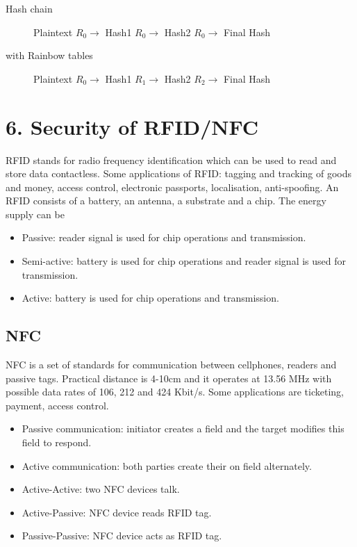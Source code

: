 \documentclass{article}
\begin{document}
\begin{description}
\item[Hash chain] Plaintext $R_0 \rightarrow$ Hash1 $R_0 \rightarrow$ Hash2 $R_0 \rightarrow$ Final Hash
\item[with Rainbow tables] Plaintext $R_0 \rightarrow$ Hash1 $R_1 \rightarrow$ Hash2 $R_2 \rightarrow$ Final Hash
\end{description}

\section*{6. Security of RFID/NFC}
RFID stands for radio frequency identification which can be used to read and store data contactless. Some applications of RFID: tagging and tracking of goods and money, access control, electronic passports, localisation, anti-spoofing. An RFID consists of a battery, an antenna, a substrate and a chip. The energy supply can be

\begin{itemize}
\item Passive: reader signal is used for chip operations and transmission.
\item Semi-active: battery is used for chip operations and reader signal is used for transmission.
\item Active: battery is used for chip operations and transmission.
\end{itemize}

\subsection*{NFC}
NFC is a set of standards for communication between cellphones, readers and passive tags. Practical distance is 4-10cm and it operates at 13.56 MHz with possible data rates of 106, 212 and 424 Kbit/s. Some applications are ticketing, payment, access control.

\begin{itemize}
\item Passive communication: initiator creates a field and the target modifies this field to respond.
\item Active communication: both parties create their on field alternately.
\item Active-Active: two NFC devices talk.
\item Active-Passive: NFC device reads RFID tag.
\item Passive-Passive: NFC device acts as RFID tag.
\end{itemize}
\end{document}
